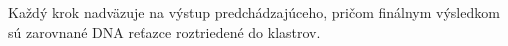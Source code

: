 Každý krok nadväzuje na výstup predchádzajúceho, pričom finálnym výsledkom sú zarovnané DNA reťazce roztriedené do klastrov.
